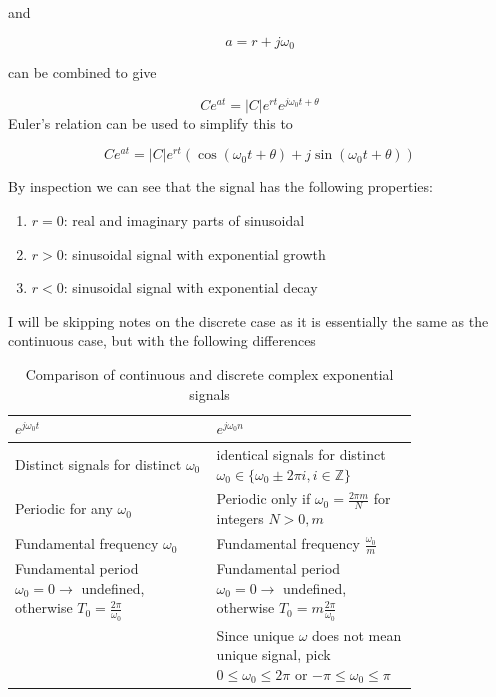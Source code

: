 \documentclass[10pt]{article}
\begin{document}
and

\begin{equation}
	a = r + j\omega_0
\end{equation}

can be combined to give

\begin{definition}
	\begin{equation}
		Ce^{at} = |C|e^{rt}e^{j\omega_0t + \theta}
	\end{equation}
	Euler's relation can be used to simplify this to


	\begin{equation}
		Ce^{at} = |C|e^{rt} \left( \cos(\omega_0t + \theta) + j \sin(\omega_0t + \theta) \right)
	\end{equation}
\end{definition}


By inspection we can see that the signal has the following properties:

\begin{enumerate}
	\item $ r = 0 $: real and imaginary parts of sinusoidal
	\item $ r > 0 $: sinusoidal signal with exponential growth
	\item $ r < 0 $: sinusoidal signal with exponential decay
\end{enumerate}


I will be skipping notes on the discrete case as it is essentially the same as the continuous case, but with the following differences

\begin{table}[H]
	\centering
	\caption{Comparison of continuous and discrete complex exponential signals}
	\label{tab:label}
	\begin{tabular}{|p{0.4\linewidth}|p{0.4\linewidth}|}
		\hline
	 $ e^{j\omega_0t} $ & $ e^{j\omega_0n} $   \\ \hline
	 Distinct signals for distinct $\omega_{0} $ & identical signals for distinct $ \omega_0 \in \{\omega_0 \pm 2\pi i, i \in \mathbb{Z}\} $   \\ \hline
	 Periodic for any $ \omega_0 $ & Periodic only if $ \omega_0 = \frac{2\pi m}{N}  $ for integers $ N>0, m $  \\ \hline
	 Fundamental frequency  $ \omega_0 $ & Fundamental frequency $\frac{\omega_0}{m}$  \\ \hline
	 Fundamental period $ \omega_0 = 0 \rightarrow $ undefined, otherwise $ T_0 = \frac{2\pi}{\omega_0} $ & Fundamental period $ \omega_0 = 0 \rightarrow $ undefined, otherwise $ T_0 = m\frac{2\pi}{\omega_0} $  \\ \hline
																																																				& Since unique $ \omega $ does not mean unique signal, pick $ 0 \le \omega_0 \le 2\pi $ or $ -\pi \le \omega_0 \le  \pi$  \\
	 \hline
	\end{tabular}
\end{table}
\end{document}
